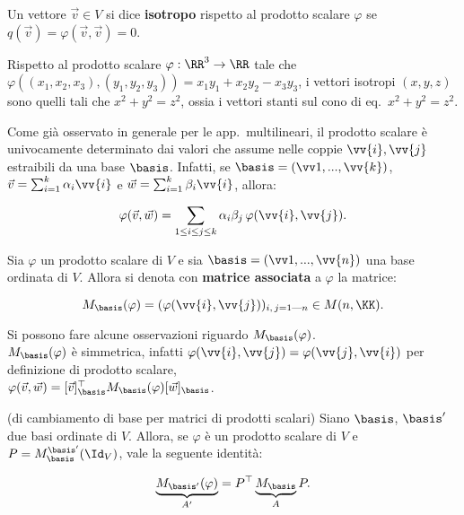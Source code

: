 \documentclass[11pt]{article}
\begin{document}
	\begin{definition}
		Un vettore $\vec{v} \in V$ si dice \textbf{isotropo} rispetto al prodotto scalare $\varphi$ se $q(\vec{v}) =
		\varphi(\vec{v}, \vec{v}) = 0$.
	\end{definition}

	\begin{example}
		Rispetto al prodotto scalare $\varphi : \RR^3 \to \RR$ tale che $\varphi((x_1, x_2, x_3), (y_1, y_2, y_3)) =
		x_1 y_1 + x_2 y_2 - x_3 y_3$, i vettori isotropi $(x, y, z)$ sono quelli tali che $x^2 + y^2 = z^2$, ossia
		i vettori stanti sul cono di eq.~$x^2 + y^2 = z^2$.
	\end{example}

	\begin{remark}
		Come già osservato in generale per le app.~multilineari, il prodotto scalare è univocamente determinato
		dai valori che assume nelle coppie $\vv{i}, \vv{j}$ estraibili da una base $\basis$. Infatti, se
		$\basis = (\vv1, ..., \vv{k})$, $\vec{v} = \sum_{i=1}^k \alpha_i \vv{i}$ e $\vec{w} = \sum_{i=1}^k \beta_i \vv{i}$,
		allora:
		
		\[ \varphi(\vec{v}, \vec{w}) = \sum_{1 \leq i \leq j \leq k} \alpha_i \beta_j \, \varphi(\vv{i}, \vv{j}). \]
	\end{remark}

	\begin{definition}
		Sia $\varphi$ un prodotto scalare di $V$ e sia $\basis = (\vv1, ..., \vv{n})$ una base ordinata di $V$. Allora si denota con \textbf{matrice associata}
		a $\varphi$ la matrice:
		
		\[ M_\basis(\varphi) = (\varphi(\vv{i}, \vv{j}))_{i,\,j = 1\text{---}n} \in M(n, \KK). \] 
	\end{definition}

	\begin{remark}
		Si possono fare alcune osservazioni riguardo $M_\basis(\varphi)$. \\
		
		\li $M_\basis(\varphi)$ è simmetrica, infatti $\varphi(\vv{i}, \vv{j}) = \varphi(\vv{j}, \vv{i})$ per
		definizione di prodotto scalare, \\
		\li $\varphi(\vec{v}, \vec{w}) = [\vec{v}]_\basis^\top M_\basis(\varphi) [\vec{w}]_\basis$.
	\end{remark}

	\begin{theorem} (di cambiamento di base per matrici di prodotti scalari) Siano $\basis$, $\basis'$ due
		basi ordinate di $V$. Allora, se $\varphi$ è un prodotto scalare di $V$ e $P = M^{\basis'}_{\basis}(\Id_V)$, vale la seguente identità:
		
		\[ \underbrace{M_{\basis'}(\varphi)}_{A'} = P^\top \underbrace{M_{\basis}}_{A} P. \]
	\end{theorem}
\end{document}
